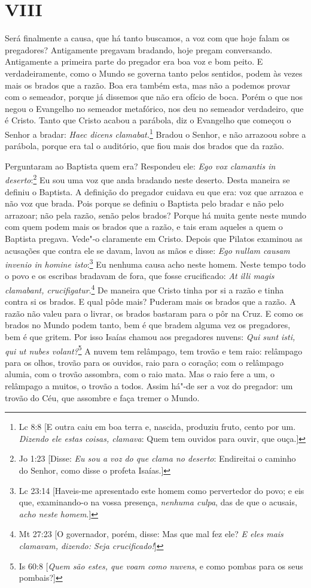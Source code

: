 \section*{VIII}

Será finalmente a causa, que há tanto buscamos, a voz com que hoje falam
os pregadores? Antigamente pregavam bradando, hoje
pregam conversando. Antigamente a primeira parte do pregador era boa voz
e bom peito. E verdadeiramente, como o Mundo se governa tanto pelos
sentidos, podem às vezes mais os brados que a razão. Boa era também
esta, mas não a podemos provar com o semeador, porque já dissemos que
não era ofício de boca. Porém o que nos negou o Evangelho no semeador
metafórico, nos deu no semeador verdadeiro, que é Cristo. Tanto que
Cristo acabou a parábola, diz o Evangelho que começou o Senhor a bradar:
\emph{Haec dicens clamabat.}\footnote{Lc 8:8 [E outra caiu em boa terra e, nascida, produziu fruto, cento por um. \emph{Dizendo ele estas coisas, clamava}: Quem tem ouvidos para ouvir, que ouça.]} Bradou o Senhor, e não arrazoou sobre a
parábola, porque era tal o auditório, que fiou mais dos brados que da
razão.

Perguntaram ao Baptista quem era? Respondeu ele: \emph{Ego vox clamantis
in deserto}:\footnote{Jo 1:23 [Disse: \emph{Eu sou a voz do que clama no deserto}: Endireitai o caminho do Senhor, como disse o profeta Isaías.]} Eu sou uma voz que anda bradando neste deserto. Desta
maneira se definiu o Baptista. A definição do pregador cuidava eu que
era: voz que arrazoa e não voz que brada. Pois porque se definiu o
Baptista pelo bradar e não pelo arrazoar; não pela razão, senão pelos
brados? Porque há muita gente neste mundo com quem podem mais os brados
que a razão, e tais eram aqueles a quem o Baptista pregava. Vede"-o
claramente em Cristo. Depois que Pilatos examinou as acusações que
contra ele se davam, lavou as mãos e disse: \emph{Ego nullam causam
invenio in homine isto}:\footnote{Lc 23:14 [Haveis-me apresentado este homem como pervertedor do povo; e eis que, examinando-o na vossa presença, \emph{nenhuma culpa}, das de que o acusais, \emph{acho neste homem}.]} Eu nenhuma causa acho neste homem. Neste
tempo todo o povo e os escribas bradavam de fora, que fosse crucificado:
\emph{At illi magis clamabant, crucifigatur}.\footnote{Mt 27:23 [O governador, porém, disse: Mas que mal fez ele? \emph{E eles mais clamavam, dizendo: Seja crucificado!}]} De maneira que Cristo
tinha por si a razão e tinha contra si os brados. E qual pôde mais?
Puderam mais os brados que a razão. A razão não valeu para o livrar, os
brados bastaram para o pôr na Cruz. E como os brados no Mundo podem
tanto, bem é que bradem alguma vez os pregadores, bem é que gritem. Por
isso Isaías chamou aos pregadores nuvens: \emph{Qui sunt isti, qui
ut nubes volant?}\footnote{Is 60:8 [\textit{Quem são estes, que voam como nuvens}, e como pombas para os seus pombais?]} A nuvem tem relâmpago, tem trovão e tem raio:
relâmpago para os olhos, trovão para os ouvidos, raio para o coração;
com o relâmpago alumia, com o trovão assombra, com o raio mata. Mas o
raio fere a um, o relâmpago a muitos, o trovão a todos. Assim há"-de ser
a voz do pregador: um trovão do Céu, que assombre e faça tremer o
Mundo.


